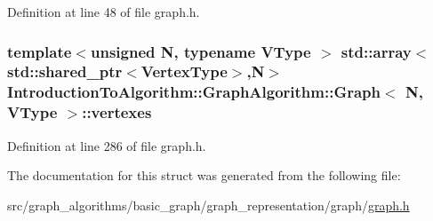 Definition at line 48 of file graph.\+h.

\hypertarget{struct_introduction_to_algorithm_1_1_graph_algorithm_1_1_graph_aea254564996a6a172f001ebf7f3c5f65}{}
\subsubsection[{vertexes}]{\setlength{\rightskip}{0pt plus 5cm}template$<$unsigned N, typename V\+Type $>$ std\+::array$<$std\+::shared\+\_\+ptr$<${\bf Vertex\+Type}$>$,N$>$ {\bf Introduction\+To\+Algorithm\+::\+Graph\+Algorithm\+::\+Graph}$<$ N, V\+Type $>$\+::vertexes}\label{struct_introduction_to_algorithm_1_1_graph_algorithm_1_1_graph_aea254564996a6a172f001ebf7f3c5f65}


Definition at line 286 of file graph.\+h.



The documentation for this struct was generated from the following file\+:\begin{DoxyCompactItemize}
\item 
src/graph\+\_\+algorithms/basic\+\_\+graph/graph\+\_\+representation/graph/\hyperlink{graph_8h}{graph.\+h}\end{DoxyCompactItemize}
